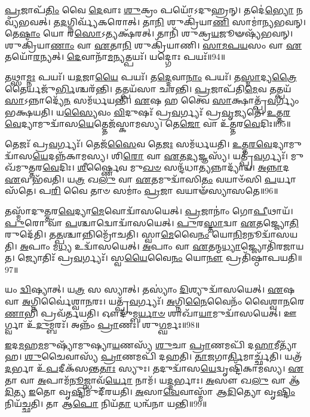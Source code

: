 \-\ul{𑌪𑍍𑌰}\-𑌜𑌾𑌪᳴\-\ul{𑌤𑌿𑌂} 𑌵𑍈 \ul{𑌦𑍇}\-𑌵𑌾𑌃  \ul{𑌶𑍁}\-𑌕𑍍𑌰𑌂 𑌪𑌯𑍋᳴𑌽𑌦𑍁𑌹𑍍𑌰𑌨𑍍। 
𑌤𑌦𑍇॑\-\ul{𑌭𑍍𑌯𑍋} 𑌨 𑌵𑍍𑌯᳴𑌭𑌵𑌤𑍍। 
𑌤\-\ul{𑌦}\-𑌗𑍍𑌨𑌿𑌰𑍍𑌵𑍍𑌯᳴𑌕𑌰𑍋𑌤𑍍। 
𑌤𑌾\-\ul{𑌨𑌿} 𑌶𑍁𑌕𑍍𑌰𑌿᳴𑌯𑌾\-\ul{𑌣𑌿} 𑌸𑌾𑌮𑌾॑𑌨𑍍𑌯𑌭𑌵𑌨𑍍। 
𑌤𑍇\-\ul{𑌷𑌾𑌂} 𑌯𑍋 𑌰\-\ul{𑌸𑍋}\-𑌽𑌤𑍍𑌯𑌕𑍍𑌷᳴𑌰𑌤𑍍। 
𑌤𑌾𑌨𑌿᳴ 𑌶𑍁𑌕𑍍𑌰\-\ul{𑌯}\-𑌜𑍂𑍟𑌷𑍍𑌯᳴𑌭𑌵𑌨𑍍। 
𑌶𑍁𑌕𑍍𑌰𑌿᳴𑌯𑌾\-\ul{𑌣𑌾𑌂} 𑌵𑌾 \ul{𑌏}\-𑌤𑌾\-\ul{𑌨𑌿} 𑌶𑍁𑌕𑍍𑌰𑌿᳴𑌯𑌾𑌣𑌿। 
\-\ul{𑌸𑌾}\-\-\ul{𑌮}\-\-\ul{𑌪}\-\-\ul{𑌯}\-𑌸𑌂 𑌵𑌾 \ul{𑌏}\-𑌤𑌯𑍋᳴\-\ul{𑌰}\-𑌨𑍍𑌯𑌤𑍍। 
\-\ul{𑌦𑍇}\-𑌵𑌾𑌨𑌾᳴\-\ul{𑌮}\-𑌨𑍍𑌯𑌤𑍍𑌪𑌯𑌃᳴। 
𑌯𑌦𑍍𑌗𑍋𑌃 𑌪𑌯𑌃᳴॥94॥

𑌤𑌥𑍍𑌸𑌾\-\ul{𑌮𑍍𑌨𑌃} 𑌪𑌯𑌃᳴। 
𑌯\-\ul{𑌦}\-𑌜𑌾\-\ul{𑌯𑍈} 𑌪𑌯𑌃᳴। 
𑌤\-\ul{𑌦𑍍𑌦𑍇}\-𑌵𑌾\-\ul{𑌨𑌾𑌂} 𑌪𑌯𑌃᳴। 
𑌤\-\ul{𑌸𑍍𑌮𑌾}\-𑌦𑍍𑌯\-\ul{𑌤𑍍𑌰𑍈}\-𑌤𑍈𑌰𑍍𑌯𑌜𑍁᳴\-\ul{𑌰𑍍𑌭𑌿}\-\-𑌶𑍍𑌚𑌰᳴𑌨𑍍𑌤𑌿। 
𑌤𑌤𑍍𑌪𑌯᳴𑌸𑌾 𑌚𑌰𑌨𑍍𑌤𑌿। 
\-\ul{𑌪𑍍𑌰}\-𑌜𑌾𑌪᳴𑌤𑌿\-\ul{𑌮𑍇}\-𑌵 𑌤𑌤𑍍𑌪𑌯᳴\-\ul{𑌸𑌾}\-𑌽𑌨𑍍𑌨𑌾𑌦𑍍𑌯𑍇᳴\-\ul{𑌨} 𑌸𑌮᳴𑌰𑍍𑌧𑌯𑌨𑍍𑌤𑌿। 
\-\ul{𑌏}\-𑌷 𑌹 𑌤𑍍𑌵𑍈 \ul{𑌸𑌾}\-𑌕𑍍𑌷𑌾𑌤𑍍𑌪𑍍𑌰᳴\-\ul{𑌵}\-𑌰𑍍𑌗𑍍𑌯𑌂᳴ 𑌭𑌕𑍍𑌷𑌯𑌤𑌿। 
𑌯\-\ul{𑌸𑍍𑌯𑍈}\-𑌵𑌂  \ul{𑌵𑌿}\-𑌦𑍁𑌷𑌃᳴ 𑌪𑍍𑌰\-\ul{𑌵}\-𑌰𑍍𑌗𑍍𑌯𑌃᳴ 𑌪𑍍𑌰\-\ul{𑌵𑍃}\-𑌜𑍍𑌯𑌤𑍇॑। 
\-\ul{𑌉}\-\-\ul{𑌤𑍍𑌤}\-\-\ul{𑌰}\-\-\ul{𑌵𑍇}\-𑌦𑍍𑌯𑌾𑌮𑍁𑌦𑍍𑌵𑌾᳴𑌸\-\-\ul{𑌯𑍇}\-𑌤𑍍𑌤𑍇𑌜᳴𑌸𑍍𑌕𑌾𑌮𑌸𑍍𑌯। 
𑌤𑍇\-\ul{𑌜𑍋} 𑌵𑌾 𑌉᳴𑌤𑍍𑌤𑌰\-\ul{𑌵𑍇}\-𑌦𑌿𑌃॥95॥

𑌤𑍇𑌜𑌃᳴ 𑌪𑍍𑌰\-\ul{𑌵}\-𑌰𑍍𑌗𑍍𑌯𑌃᳴। 
𑌤𑍇𑌜᳴\-\ul{𑌸𑍈}\-𑌵 𑌤𑍇\-\ul{𑌜𑌃} 𑌸𑌮᳴𑌰𑍍𑌧𑌯𑌤𑌿। 
\-\ul{𑌉}\-\-\ul{𑌤𑍍𑌤}\-\-\ul{𑌰}\-\-\ul{𑌵𑍇}\-𑌦𑍍𑌯𑌾𑌮𑍁𑌦𑍍𑌵𑌾᳴𑌸\-\ul{𑌯𑍇}\-\-𑌦𑌨𑍍𑌨᳴\-𑌕𑌾𑌮𑌸𑍍𑌯। 
𑌶𑌿\-\ul{𑌰𑍋} 𑌵𑌾 \ul{𑌏}\-𑌤\-\ul{𑌦𑍍𑌯}\-𑌜𑍍𑌞𑌸𑍍𑌯᳴। 
𑌯𑌤𑍍𑌪𑍍𑌰᳴\-\ul{𑌵}\-𑌰𑍍𑌗𑍍𑌯𑌃᳴। 
𑌮𑍁𑌖᳴𑌮𑍁𑌤𑍍𑌤𑌰\-\ul{𑌵𑍇}\-𑌦𑌿𑌃। 
\-\ul{𑌶𑍀}\-𑌰𑍍𑌷𑍍𑌣𑍈𑌵 𑌮𑍁\-\ul{𑌖}\-\-\ul{𑍞} 𑌸𑌨𑍍𑌦᳴𑌧𑌾\-\ul{𑌤𑍍𑌯}\-𑌨𑍍𑌨𑌾𑌦𑍍𑌯𑌾᳴𑌯। 
\-\ul{𑌅}\-\-\ul{𑌨𑍍𑌨𑌾}\-𑌦 \ul{𑌏}\-𑌵 𑌭᳴𑌵𑌤𑌿। 
𑌯\-\ul{𑌤𑍍𑌰} 𑌖\-\ul{𑌲𑍁} 𑌵𑌾 \ul{𑌏}\-𑌤𑌮𑍁𑌦𑍍𑌵𑌾᳴𑌸𑌿\-\ul{𑌤𑌂} 𑌵𑌯𑌾𑍞᳴𑌸𑌿 \ul{𑌪}\-𑌰𑍍𑌯𑌾𑌸᳴𑌤𑍇। 
𑌪\-\ul{𑌰𑌿} 𑌵𑍈 𑌤𑌾𑍞 𑌸𑌮𑌾𑌂॑ \ul{𑌪𑍍𑌰}\-𑌜𑌾 𑌵𑌯𑌾𑍟᳴𑌸𑍍𑌯𑌾𑌸𑌤𑍇॥96॥

𑌤𑌸𑍍𑌮𑌾᳴𑌦𑍁𑌤𑍍𑌤𑌰\-\ul{𑌵𑍇}\-𑌦𑍍𑌯𑌾\-\ul{𑌮𑍇}\-𑌵𑍋𑌦𑍍𑌵𑌾᳴𑌸𑌯𑍇𑌤𑍍। 
\-\ul{𑌪𑍍𑌰}\-𑌜𑌾𑌨𑌾𑌂॑ 𑌗𑍋\-\ul{𑌪𑍀}\-𑌥𑌾𑌯᳴। 
\-\ul{𑌪𑍁}\-𑌰𑍋 𑌵𑌾᳴ \ul{𑌪}\-𑌶𑍍𑌚𑌾𑌦𑍍𑌵𑍋𑌦𑍍𑌵𑌾᳴𑌸𑌯𑍇𑌤𑍍। 
\-\ul{𑌪𑍁}\-𑌰\-\ul{𑌸𑍍𑌤𑌾}\-𑌦𑍍𑌵𑌾 \ul{𑌏}\-𑌤𑌜𑍍𑌜𑍍𑌯𑍋\-\ul{𑌤𑌿}\-𑌰𑍁𑌦𑍇᳴𑌤𑌿। 
𑌤\-\ul{𑌤𑍍𑌪}\-𑌶𑍍𑌚𑌾𑌨𑍍𑌨𑌿𑌮𑍍𑌰𑍋᳴𑌚𑌤𑌿। 
𑌸𑍍𑌵𑌾\-\ul{𑌮𑍇}\-𑌵𑍈\-\ul{𑌨𑌂} 𑌯𑍋\-\ul{𑌨𑌿}\-𑌮𑌨𑍂𑌦𑍍𑌵𑌾᳴𑌸𑌯𑌤𑌿। 
\-\ul{𑌅}\-𑌪𑌾𑌂 𑌮\-\ul{𑌧𑍍𑌯} 𑌉𑌦𑍍𑌵𑌾᳴𑌸𑌯𑍇𑌤𑍍। 
\-\ul{𑌅}\-𑌪𑌾𑌂 𑌵𑌾 \ul{𑌏}\-𑌤𑌨𑍍𑌮\-\ul{𑌧𑍍𑌯𑌾}\-𑌜𑍍𑌜𑍍𑌯𑍋𑌤𑌿᳴𑌰𑌜𑌾𑌯𑌤। 
𑌜𑍍𑌯𑍋𑌤𑌿𑌃᳴ 𑌪𑍍𑌰\-\ul{𑌵}\-𑌰𑍍𑌗𑍍𑌯𑌃᳴। 
𑌸𑍍𑌵\-\ul{𑌯𑍈}\-𑌵𑍈\-\ul{𑌨𑌂} 𑌯𑍋\-\ul{𑌨𑍗} 𑌪𑍍𑌰𑌤𑌿᳴𑌷𑍍𑌠𑌾𑌪𑌯𑌤𑌿॥97॥

𑌯𑌂 \ul{𑌦𑍍𑌵𑌿}\-𑌷𑍍𑌯𑌾𑌤𑍍। 
𑌯\-\ul{𑌤𑍍𑌰} 𑌸 𑌸𑍍𑌯𑌾𑌤𑍍। 
𑌤𑌸𑍍𑌯𑌾𑌂॑ \ul{𑌦𑌿}\-𑌶𑍍𑌯𑍁𑌦𑍍𑌵𑌾᳴𑌸𑌯𑍇𑌤𑍍। 
\-\ul{𑌏}\-𑌷 𑌵𑌾 \ul{𑌅}\-𑌗𑍍𑌨𑌿𑌰𑍍𑌵𑍈॑𑌶𑍍𑌵𑌾\-\ul{𑌨}\-𑌰𑌃। 
𑌯𑌤𑍍𑌪𑍍𑌰᳴\-\ul{𑌵}\-𑌰𑍍𑌗𑍍𑌯𑌃᳴। 
\-\ul{𑌅}\-𑌗𑍍𑌨𑌿\-\ul{𑌨𑍈}\-𑌵𑍈𑌨𑌂᳴ 𑌵𑍈𑌶𑍍𑌵𑌾\-\ul{𑌨}\-𑌰𑍇\-\ul{𑌣𑌾}\-𑌭𑌿 𑌪𑍍𑌰𑌵᳴𑌰𑍍𑌤𑌯𑌤𑌿। 
𑌔𑌦𑍁᳴𑌮𑍍𑌬\-\ul{𑌰𑍍𑌯𑌾}\-\-\ul{𑍞} 𑌶𑌾𑌖𑌾᳴\-\ul{𑌯𑌾}\-𑌮𑍁𑌦𑍍𑌵𑌾᳴𑌸𑌯𑍇𑌤𑍍। 
𑌊𑌰𑍍𑌗𑍍𑌵𑌾 𑌉᳴\-\ul{𑌦𑍁}\-𑌮𑍍𑌬𑌰𑌃᳴। 
𑌅𑌨𑍍𑌨𑌂᳴ \ul{𑌪𑍍𑌰𑌾}\-𑌣𑌃। 
𑌶𑍁\-\ul{𑌗𑍍𑌘}\-𑌰𑍍𑌮𑌃॥98॥

\-\ul{𑌇}\-𑌦\-\ul{𑌮}\-𑌹\-\ul{𑌮}\-𑌮𑍁𑌷𑍍𑌯𑌾᳴𑌮𑍁𑌷𑍍𑌯𑌾\-\ul{𑌯}\-𑌣𑌸𑍍𑌯᳴ \ul{𑌶𑍁}\-𑌚𑌾 \ul{𑌪𑍍𑌰𑌾}\-𑌣𑌮𑌪𑌿᳴ 𑌦\-\ul{𑌹𑌾}\-𑌮𑍀𑌤𑍍𑌯𑌾᳴𑌹। 
\-\ul{𑌶𑍁}\-𑌚𑍈𑌵𑌾𑌸𑍍𑌯᳴ \ul{𑌪𑍍𑌰𑌾}\-𑌣𑌮𑌪𑌿᳴ 𑌦𑌹𑌤𑌿। 
\-\ul{𑌤𑌾}\-𑌜𑌗𑌾\-\ul{𑌰𑍍𑌤𑌿}\-𑌮𑌾𑌰𑍍𑌚𑍍𑌛᳴𑌤𑌿। 
𑌯𑌤𑍍𑌰᳴ \ul{𑌦}\-𑌰𑍍𑌭𑌾 𑌉᳴\-\ul{𑌪}\-𑌦𑍀𑌕᳴𑌸𑌨𑍍𑌤\-\ul{𑌤𑌾𑌃} 𑌸𑍍𑌯𑍁𑌃। 
𑌤𑌦𑍁𑌦𑍍𑌵𑌾᳴𑌸\-\ul{𑌯𑍇}\-𑌦𑍍𑌵𑍃𑌷𑍍𑌟𑌿᳴𑌕𑌾𑌮𑌸𑍍𑌯। 
\-\ul{𑌏}\-𑌤𑌾 𑌵𑌾 \ul{𑌅}\-𑌪𑌾𑌮᳴\-\ul{𑌨𑍂}\-𑌜𑍍𑌝𑌾𑌵᳴\-\ul{𑌰𑍍𑌯𑍋} 𑌨𑌾𑌮᳴। 
𑌯\-\ul{𑌦𑍍𑌦}\-𑌰𑍍𑌭𑌾𑌃। 
\-\ul{𑌅}\-𑌸𑍗 𑌖\-\ul{𑌲𑍁} 𑌵𑌾 𑌆᳴\-\ul{𑌦𑌿}\-𑌤𑍍𑌯 \ul{𑌇}\-𑌤𑍋 𑌵𑍃\-\ul{𑌷𑍍𑌟𑌿}\-𑌮𑍁𑌦𑍀᳴𑌰𑌯𑌤𑌿। 
\-\ul{𑌅}\-𑌸𑌾\-\ul{𑌵𑍇}\-𑌵𑌾𑌸𑍍𑌮𑌾᳴ 𑌆\-\ul{𑌦𑌿}\-𑌤𑍍𑌯𑍋 𑌵𑍃\-\ul{𑌷𑍍𑌟𑌿𑌂} 𑌨𑌿𑌯᳴𑌚𑍍𑌛𑌤𑌿। 
𑌤𑌾 𑌆\-\ul{𑌪𑍋} 𑌨𑌿𑌯᳴\-\ul{𑌤𑌾} 𑌧𑌨𑍍𑌵᳴𑌨𑌾 𑌯𑌨𑍍𑌤𑌿॥99॥
\anuvakamend[𑌗𑍋𑌃 𑌪𑌯᳴ 𑌉𑌤𑍍𑌤𑌰\-\ul{𑌵𑍇}\-𑌦𑌿𑌰𑌾᳴𑌸𑌤𑍇 𑌸𑍍𑌥𑌾𑌪𑌯𑌤𑌿 \ul{𑌘}\-𑌰𑍍𑌮𑍋 𑌯᳴𑌨𑍍𑌤𑌿]

